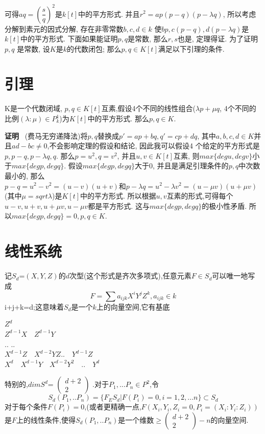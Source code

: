 \documentclass[UTF8]{book}
\begin{document}
		
		可得$aq=(\dfrac{s}{q})^{2}$是$ k[t] $中的平方形式. 并且$r^{2}=ap(p-q)(p-\lambda q)$, 所以考虑分解到素元的因式分解, 存在非零常数$b,c,d\in k $ 使$bp,c(p-q),d(p-\lambda q)$是$ k[t] $中的平方形式. 下面如果能证明$ p, q $是常数, 那么$ r, s $也是, 定理得证. 为了证明$ p, q $ 是常数, 设$ K $是$ k $的代数闭包; 那么$p,q\in K[t]$满足以下引理的条件.

	\section{引理}
		K是一个代数闭域, $p,q\in K[t]$互素,假设4个不同的线性组合($\lambda p+\mu q$, 4个不同的比例$(\lambda:\mu)\in P^{1}_{k}$)为$ K[t] $中的平方形式. 那么$p,q\in K$.
		
		
		\textbf{证明} \ (费马无穷递降法)将$ p,q $替换成$ p'=ap+bq,q'=cp+dq $, 其中$a,b,c,d\in K$并且$ad-bc\neq 0$,不会影响定理的假设和结论, 因此我可以假设4 个给定的平方形式是$p,p-q,p-\lambda q,q$. 那么$p=u^{2},q=v^{2}$, 并且$u,v\in K[t]$互素, 则$max\{deg u,deg v\}$小于$max\{deg p,deg q\}$. 假设$max\{deg p,deg q\}$大于0, 并且是满足引理条件的$ p,q $中次数最小的, 那么$p-q=u^{2}-v^{2}=(u-v)(u+v)和p-\lambda q=u^{2}-\lambda v^{2}=(u-\mu v)(u+\mu v)$(其中$\mu=sqrt{\lambda}$)是$ K[t] $中的平方形式. 所以根据$ u,v $互素的形式,可得每个$u-v,u+v,u+\mu v,u-\mu v$都是平方形式. 这与$ max\{deg p,deg q\} $的极小性矛盾. 所以$max\{deg p,deg q\}=0, p,q\in K.$
	\section{线性系统}
		记$S_{d}$={$ (X,Y,Z) $的$ d $次型}(这个形式是齐次多项式),任意元素$F \in S_{d}$可以唯一地写成
		\begin{equation*}
		F=\sum a_{ijk} X^{i}Y^{j}Z^{k},a_{ijk} \in k
		\end{equation*}
		i+j+k=d;这意味着$S_{d}$是一个$ k $上的向量空间,它有基底
		\begin{center}
		$Z^{d}$\\
		$Z^{d-1}X  \quad Z^{d-1}Y$\\
		..            ..\\
		$X^{d-1}Z  \quad X^{d-2}YZ  ..  \quad Y^{d-1}Z$\\
		$X^{d}\quad X^{d-1}Y  \quad X^{d-2}Y^{2}\quad   ..  \quad Y^{d}$\\
		\end{center}
		特别的,$dimS^{d}$=
		$\begin{pmatrix}
		     d+2  \\
		      2
		\end{pmatrix}$
		.对于$P_{1},...P_{n} \in P^{2}$,令
		\begin{equation*}
		S_{d}(P_{1},..P_{n})=\{F_{E}S_{d}|F(P_{i})=0,i=1,2,...n\} \subset S_{d}
		\end{equation*}
		对于每个条件$ F(P_{i})=0 $,(或者更精确一点,$ F(X_{i},Y_{i},Z_{i}=0,P_{i}=(X_{i}:Y_{i}:Z_{i})) $
		是$ F $上的线性条件,使得$S_{d}(P_{1},..P_{n})$是一个维数$\geq\left(\begin{array}{c}{d+2} \\ {2}\end{array}\right)-n$的向量空间.
\end{document}
